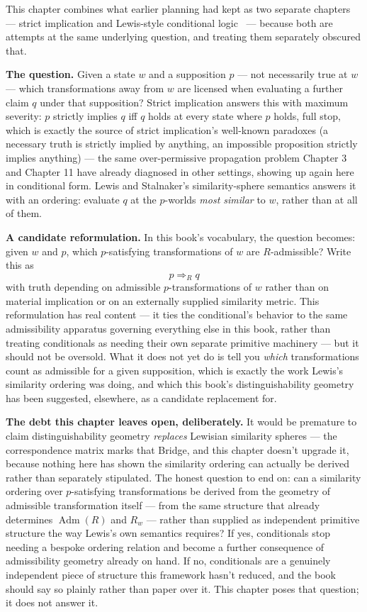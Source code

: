 This chapter combines what earlier planning had kept as two separate
chapters --- strict implication and Lewis-style conditional logic~\cite{lewis1973} --- because
both are attempts at the same underlying question, and treating them
separately obscured that.

\textbf{The question.} Given a state \(w\) and a supposition \(p\) --- not
necessarily true at \(w\) --- which transformations away from \(w\) are
licensed when evaluating a further claim \(q\) under that supposition?
Strict implication answers this with maximum severity: \(p\) strictly
implies \(q\) iff \(q\) holds at every state where \(p\) holds, full stop,
which is exactly the source of strict implication's well-known paradoxes
(a necessary truth is strictly implied by anything, an impossible
proposition strictly implies anything) --- the same over-permissive
propagation problem Chapter 3 and Chapter 11 have already diagnosed in
other settings, showing up again here in conditional form. Lewis and
Stalnaker's similarity-sphere semantics answers it with an ordering:
evaluate \(q\) at the \(p\)-worlds \emph{most similar} to \(w\), rather than at all
of them.

\textbf{A candidate reformulation.} In this book's vocabulary, the question
becomes: given \(w\) and \(p\), which \(p\)-satisfying transformations of \(w\)
are \(R\)-admissible? Write this as
\[p \Rightarrow_R q\]
with truth depending on admissible \(p\)-transformations of \(w\) rather than
on material implication or on an externally supplied similarity metric.
This reformulation has real content --- it ties the conditional's behavior
to the same admissibility apparatus governing everything else in this
book, rather than treating conditionals as needing their own separate
primitive machinery --- but it should not be oversold. What it does not
yet do is tell you \emph{which} transformations count as admissible for a
given supposition, which is exactly the work Lewis's similarity ordering
was doing, and which this book's distinguishability geometry has been
suggested, elsewhere, as a candidate replacement for.

\textbf{The debt this chapter leaves open, deliberately.} It would be
premature to claim distinguishability geometry \emph{replaces} Lewisian
similarity spheres --- the correspondence matrix marks that Bridge, and
this chapter doesn't upgrade it, because nothing here has shown the
similarity ordering can actually be derived rather than separately
stipulated. The honest question to end on: can a similarity ordering
over \(p\)-satisfying transformations be derived from the geometry of
admissible transformation itself --- from the same structure that already
determines \(\operatorname{Adm}(R)\) and \(R_w\) --- rather than supplied as
independent primitive structure the way Lewis's own semantics requires?
If yes, conditionals stop needing a bespoke ordering relation and become
a further consequence of admissibility geometry already on hand. If no,
conditionals are a genuinely independent piece of structure this
framework hasn't reduced, and the book should say so plainly rather than
paper over it. This chapter poses that question; it does not answer it.

